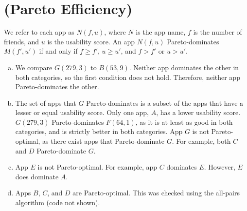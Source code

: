 \documentclass[12pt]{article}
\begin{document}
\section{(Pareto Efficiency)}
We refer to each app as $N(f, u)$, where $N$ is the app name, $f$ is the number of friends, and $u$ is the usability score. An app $N(f, u)$ Pareto-dominates $M(f', u')$ if and only if $f \geq f'$, $u \geq u'$, and $f > f'$ or $u > u'$.
\begin{enumerate}[(a)]
\item We compare $G(279, 3)$ to $B(53, 9)$. Neither app dominates the other in both categories, so the first condition does not hold. Therefore, neither app Pareto-dominates the other.

\item The set of apps that $G$ Pareto-dominates is a subset of the apps that have a lesser or equal usability score. Only one app, $A$, has a lower usability score. $G(279, 3)$ Pareto-dominates $F(64, 1)$, as it is at least as good in both categories, and is strictly better in both categories. App $G$ is not Pareto-optimal, as there exist apps that Pareto-dominate $G$. For example, both $C$ and $D$ Pareto-dominate $G$.

\item App $E$ is not Pareto-optimal. For example, app $C$ dominates $E$. However, $E$ does dominate $A$.

\item Apps $B$, $C$, and $D$ are Pareto-optimal. This was checked using the all-pairs algorithm (code not shown).
\end{enumerate}
\end{document}
